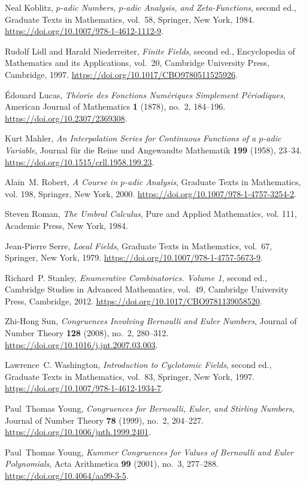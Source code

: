 Neal Koblitz, \emph{{{$p$}-adic Numbers, {$p$}-adic Analysis, and
  Zeta-Functions}}, second ed., Graduate Texts in Mathematics, vol.~58,
  Springer, New York, 1984.
\url{https://doi.org/10.1007/978-1-4612-1112-9}.

Rudolf Lidl and Harald Niederreiter, \emph{{Finite Fields}}, second ed.,
  Encyclopedia of Mathematics and its Applications, vol.~20, Cambridge
  University Press, Cambridge, 1997.
\url{https://doi.org/10.1017/CBO9780511525926}.

\'Edouard Lucas, \emph{{Th\'eorie des Fonctions Num\'eriques Simplement
  P\'eriodiques}}, American Journal of Mathematics \textbf{1} (1878), no.~2,
  184--196.
\url{https://doi.org/10.2307/2369308}.

Kurt Mahler, \emph{{An Interpolation Series for Continuous Functions of a
  {$p$}-adic Variable}}, Journal f\"ur die Reine und Angewandte Mathematik
  \textbf{199} (1958), 23--34.
\url{https://doi.org/10.1515/crll.1958.199.23}.

Alain~M. Robert, \emph{{A Course in {$p$}-adic Analysis}}, Graduate Texts in
  Mathematics, vol. 198, Springer, New York, 2000.
\url{https://doi.org/10.1007/978-1-4757-3254-2}.

Steven Roman, \emph{{The Umbral Calculus}}, Pure and Applied Mathematics, vol.
  111, Academic Press, New York, 1984.

Jean-Pierre Serre, \emph{{Local Fields}}, Graduate Texts in Mathematics,
  vol.~67, Springer, New York, 1979.
\url{https://doi.org/10.1007/978-1-4757-5673-9}.

Richard~P. Stanley, \emph{{Enumerative Combinatorics. Volume 1}}, second ed.,
  Cambridge Studies in Advanced Mathematics, vol.~49, Cambridge University
  Press, Cambridge, 2012.
\url{https://doi.org/10.1017/CBO9781139058520}.

Zhi-Hong Sun, \emph{{Congruences Involving Bernoulli and Euler Numbers}},
  Journal of Number Theory \textbf{128} (2008), no.~2, 280--312.
\url{https://doi.org/10.1016/j.jnt.2007.03.003}.

Lawrence~C. Washington, \emph{{Introduction to Cyclotomic Fields}}, second ed.,
  Graduate Texts in Mathematics, vol.~83, Springer, New York, 1997.
\url{https://doi.org/10.1007/978-1-4612-1934-7}.

Paul~Thomas Young, \emph{{Congruences for Bernoulli, Euler, and Stirling
  Numbers}}, Journal of Number Theory \textbf{78} (1999), no.~2, 204--227.
\url{https://doi.org/10.1006/jnth.1999.2401}.

Paul~Thomas Young, \emph{{Kummer Congruences for Values of Bernoulli and Euler
  Polynomials}}, Acta Arithmetica \textbf{99} (2001), no.~3, 277--288.
\url{https://doi.org/10.4064/aa99-3-5}.
